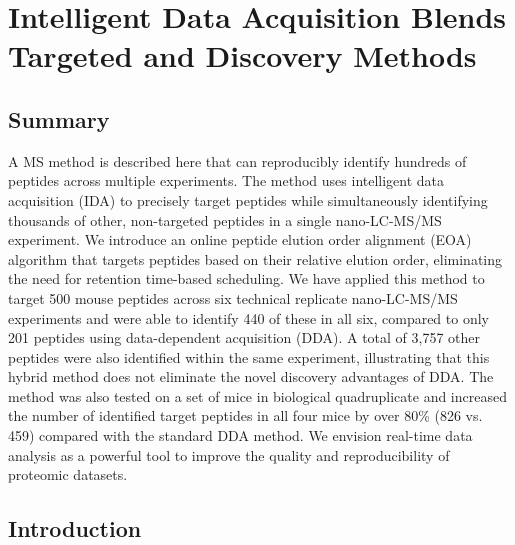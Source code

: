 \chapter{Intelligent Data Acquisition Blends Targeted and Discovery Methods}

\section{Summary}

A MS method is described here that can reproducibly identify hundreds of peptides across multiple experiments. The method uses intelligent data acquisition (IDA) to precisely target peptides while simultaneously identifying thousands of other, non-targeted peptides in a single nano-LC-MS/MS experiment. We introduce an online peptide elution order alignment (EOA) algorithm that targets peptides based on their relative elution order, eliminating the need for retention time-based scheduling. We have applied this method to target 500 mouse peptides across six technical replicate nano-LC-MS/MS experiments and were able to identify 440 of these in all six, compared to only 201 peptides using data-dependent acquisition (DDA). A total of 3,757 other peptides were also identified within the same experiment, illustrating that this hybrid method does not eliminate the novel discovery advantages of DDA. The method was also tested on a set of mice in biological quadruplicate and increased the number of identified target peptides in all four mice by over 80\% (826 vs. 459) compared with the standard DDA method. We envision real-time data analysis as a powerful tool to improve the quality and reproducibility of proteomic datasets.

\section{Introduction}

